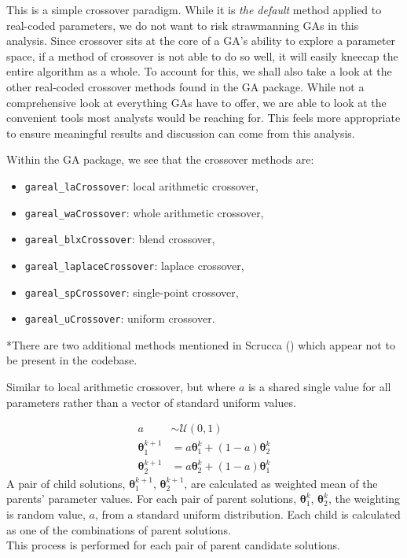 \documentclass[
  a4paper,
]{article}
\newcommand{\B}[1]{\boldsymbol{#1}}
\newcommand{\+}{\phantom{-}}
\begin{document}
This is a simple crossover paradigm. While it is \emph{the default}
method applied to real-coded parameters, we do not want to risk
strawmanning GAs in this analysis. Since crossover sits at the core of a
GA's ability to explore a parameter space, if a method of crossover is
not able to do so well, it will easily kneecap the entire algorithm as a
whole. To account for this, we shall also take a look at the other
real-coded crossover methods found in the GA package. While not a
comprehensive look at everything GAs have to offer, we are able to look
at the convenient tools most analysts would be reaching for. This feels
more appropriate to ensure meaningful results and discussion can come
from this analysis.

Within the GA package, we see that the crossover methods are:

\begin{itemize}
  \item[{[default]}] \verb|gareal_laCrossover|: local arithmetic crossover,
  \item[--] \verb|gareal_waCrossover|: whole arithmetic crossover,
  \item[--] \verb|gareal_blxCrossover|: blend crossover,
  \item[--] \verb|gareal_laplaceCrossover|: laplace crossover,
  \item[{[missing]}]\verb|gareal_spCrossover|: single-point crossover,
  \item[{[missing]}]\verb|gareal_uCrossover|: uniform crossover.
\end{itemize}

*There are two additional methods mentioned in Scrucca
() which appear not to be present in the
codebase.

\begin{tcolorbox}[title=Whole arithmetic crossover: \texttt{gareal\_waCrossover()}]
Similar to local arithmetic crossover, but where $a$ is a shared single value for all parameters rather than a vector of standard uniform values.

$$
\begin{aligned}
a &\sim \mathcal U\!\left(0,1\right)\\
\B\theta_1^{k+1} &= a \B\theta_1^k +\left(1-a\right)\B\theta_2^k \\
\B\theta_2^{k+1} &= a \B\theta_2^k +\left(1-a\right)\B\theta_1^k
\end{aligned}
$$
A pair of child solutions, $\B\theta_1^{k+1}$, $\B\theta_2^{k+1}$, are calculated as weighted mean of the parents' parameter values. For each pair of parent solutions, $\B\theta^k_1$, $\B\theta^k_2$, the weighting is random value, $a$, from a standard uniform distribution. Each child is calculated as one of the combinations of parent solutions.\\

This process is performed for each pair of parent candidate solutions.
\end{tcolorbox}
\end{document}
